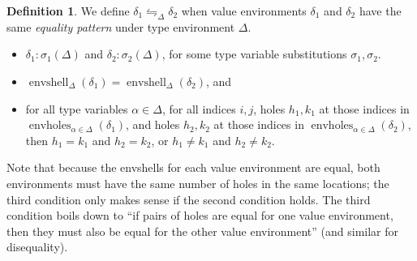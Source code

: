 \documentclass{report}
\theoremstyle{definition}
\newtheorem{definition}{Definition}
\DeclareMathOperator{\envshell}{envshell}
\DeclareMathOperator{\envholes}{envholes}
\newcommand{\eqpat}{\leftrightharpoons}
\newcommand{\eqpatD}{\eqpat_{\Delta}}
\begin{document}
\begin{definition}
	\label{def:eqpat}
	We define \(\delta_1 \eqpatD \delta_2\) when value environments \(\delta_1\) and \(\delta_2\) have the same \emph{equality pattern} under type environment \(\Delta\).
	\begin{itemize}
		\item \(\delta_1 : \sigma_1(\Delta)\) and \(\delta_2 : \sigma_2(\Delta)\), for some type variable substitutions \(\sigma_1, \sigma_2\).
		\item \(\envshell_{\Delta}(\delta_1) = \envshell_{\Delta}(\delta_2)\), and
		\item for all type variables \(\alpha \in \Delta\), for all indices \(i, j\),
			holes \(h_1, k_1\) at those indices in \(\envholes_{\alpha \in \Delta}(\delta_1)\),
			and holes \(h_2, k_2\) at those indices in \(\envholes_{\alpha \in \Delta}(\delta_2)\),
			then \(h_1 = k_1\) and \(h_2 = k_2\), or \(h_1 \ne k_1\) and \(h_2 \ne k_2\).
	\end{itemize}
\end{definition}

Note that because the envshells for each value environment are equal, both environments must have the same number of holes in the same locations;
the third condition only makes sense if the second condition holds.
The third condition boils down to ``if pairs of holes are equal for one value environment, then they must also be equal for the other value environment'' (and similar for disequality).
\end{document}
